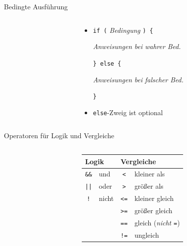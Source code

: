 \documentclass[
  aspectratio=1610,
]{beamer}
\begin{document}
\begin{frame}{Bedingte Ausführung}
  \begin{columns}[T]
    \begin{column}{0.45\textwidth}
      \inputminted[tabsize=4]{c}{bedingung.c}
    \end{column}
    \begin{column}{0.45\textwidth}
      \pause

      \begin{itemize}
        \item \texttt{if (} %
          \textit{Bedingung}
          \texttt{) \{} %

          \quad\textit{Anweisungen bei wahrer Bed.}

          \texttt{\} else \{}

          \quad\textit{Anweisungen bei falscher Bed.}

          \texttt{\}}

        \item \texttt{else}-Zweig ist optional
      \end{itemize}
    \end{column}
  \end{columns}
\end{frame}

\begin{frame}{Operatoren für Logik und Vergleiche}
  \begin{columns}[T]
    \begin{column}{0.6\textwidth}
      \inputminted[tabsize=4]{c}{logische_operatoren.c}
    \end{column}
    \begin{column}{0.4\textwidth}
      \pause

      \begin{tabular}{clcl}
        \toprule
        \multicolumn{2}{l}{Logik} & \multicolumn{2}{l}{Vergleiche}\\
        \midrule
        \texttt{\&\&} & und   & \texttt{<}  & kleiner als\\
        \texttt{||}   & oder  & \texttt{>}  & größer als\\
        \texttt{!}    & nicht & \texttt{<=} & kleiner gleich\\
                      &       & \texttt{>=} & größer gleich\\
                      &       & \texttt{==} & gleich (\emph{nicht \texttt{=}})\\
                      &       & \texttt{!=} & ungleich\\
      \end{tabular}
    \end{column}
  \end{columns}
\end{frame}
\end{document}
